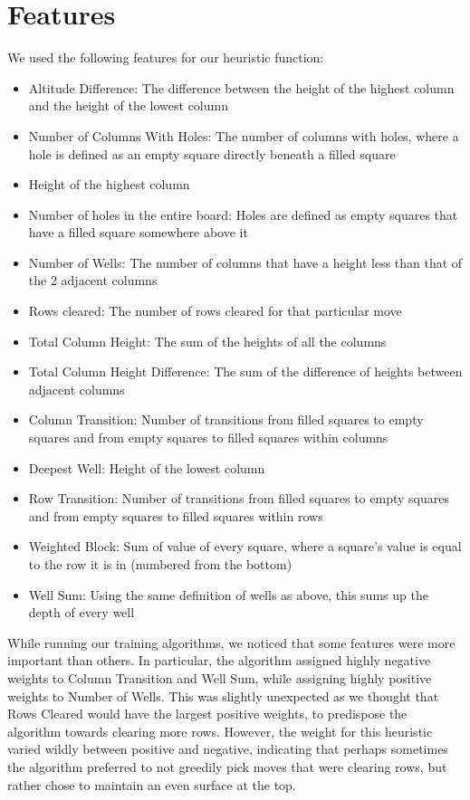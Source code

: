 \documentclass{article}
\begin{document}
    \section{Features}
    We used the following features for our heuristic function:
    \begin{itemize}
        \item Altitude Difference: The difference between the height of the highest
        column and the height of the lowest column
        \item Number of Columns With Holes: The number of columns with holes, where a hole
        is defined as an empty square directly beneath a filled square
        \item Height of the highest column
        \item Number of holes in the entire board: Holes are defined as empty squares
		that have a filled square somewhere above it
        \item Number of Wells: The number of columns that have a height less than that of the 2
        adjacent columns
        \item Rows cleared: The number of rows cleared for that particular move
        \item Total Column Height: The sum of the heights of all the columns
        \item Total Column Height Difference: The sum of the difference of heights between adjacent columns
        \item Column Transition: Number of transitions from filled squares to empty squares
		and from empty squares to filled squares within columns
        \item Deepest Well: Height of the lowest column
        \item Row Transition: Number of transitions from filled squares to empty squares
		and from empty squares to filled squares within rows
        \item Weighted Block: Sum of value of every square, where a square's value is equal to
		the row it is in (numbered from the bottom)
        \item Well Sum: Using the same definition of wells as above, this sums up
		the depth of every well
    \end{itemize}

    While running our training algorithms, we noticed that some features were more
	important than others. In particular, the algorithm assigned highly negative
	weights to Column Transition and Well Sum, while assigning highly positive
	weights to Number of Wells. This was slightly unexpected as we thought that
	Rows Cleared would have the largest positive weights, to predispose the algorithm
	towards clearing more rows. However, the weight for this heuristic varied wildly
	between positive and negative, indicating that perhaps sometimes the algorithm
	preferred to not greedily pick moves that were clearing rows, but rather chose
	to maintain an even surface at the top.
\end{document}
